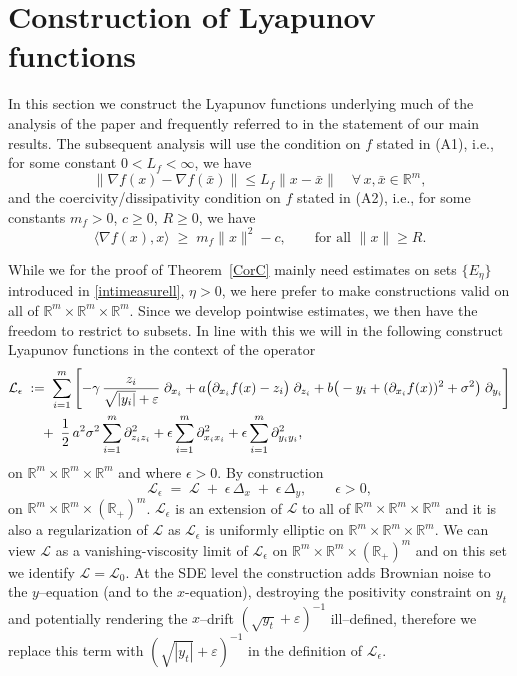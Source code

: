 \documentclass[11pt, a4paper,leqno]{amsart}
\theoremstyle{definition}
\numberwithin{equation}{section}
\newcommand{\R}{\mathbb R}
\begin{document}
\section{Construction of Lyapunov functions} \label{sec:lya}

In this section we construct the Lyapunov functions underlying much of the analysis of the paper and frequently referred to in the statement of our main results. The subsequent analysis will use the condition on $f$ stated in \textnormal{(A1)}, i.e.,
for some constant $0<L_f<\infty$, we have
\begin{equation}\label{D-}
\|\nabla f(x)-\nabla f(\bar x)\| \le L_f \|x-\bar x\|
\quad \forall\, x,\bar x \in \R^m,
\end{equation}
and the coercivity/dissipativity condition on $f$ stated in \textnormal{(A2)}, i.e., for some constants $m_f>0$, $c\ge0$, $R\ge0$, we have
\begin{equation}\label{D}
\langle \nabla f(x),x\rangle \;\ge\; m_f\|x\|^2 - c,
\qquad \text{for all }\|x\|\ge R.
\end{equation}

While we for the proof of Theorem~\ref{CorC} mainly need estimates on sets $\{E_\eta\}$ introduced in \eqref{intimeasurell}, $\eta>0$, we here prefer to make constructions
valid on all of $\mathbb R^m\times \mathbb R^m\times\mathbb R^m$. Since we develop pointwise estimates, we then have the freedom
to restrict to subsets. In line with this we will in the following construct Lyapunov functions in the context of the operator
\begin{align}\label{Regloss1}
\mathcal{L}_\epsilon \;&:=\; \sum_{i=1}^m \Bigg[{-\gamma\,\frac{z_i}{\sqrt{|y_i|}+\varepsilon}}\;\partial_{x_i}
+a\big(\partial_{x_i}f(x)-z_i\big)\;\partial_{z_i}+b\big(-y_i+(\partial_{x_i}f(x))^2+\sigma^2\big)\;\partial_{y_i}
\Bigg]\notag\\
&\quad +\;\frac12\,a^2\sigma^2\sum_{i=1}^m \partial_{z_i z_i}^2+\epsilon\sum_{i=1}^m \partial_{x_i x_i}^2+\epsilon\sum_{i=1}^m \partial_{y_i y_i}^2,
\end{align}
on $\R^m\times\R^m\times\R^m$ and where $\epsilon>0$.  By construction
\[
\mathcal{L}_\epsilon \;=\; \mathcal{L} \;+\; \epsilon\,\Delta_x\;+\; \epsilon\,\Delta_y,\qquad \epsilon>0,
\]
on $\R^m\times\R^m\times(\R_+)^m$. $\mathcal{L}_\epsilon$ is an extension of $\mathcal{L}$ to all of $\R^m\times\R^m\times\R^m$  and it is also a regularization of $\mathcal{L}$ as $\mathcal{L}_\epsilon$ is uniformly elliptic  on $\R^m\times\R^m\times\R^m$. We can  view $\mathcal L$ as a vanishing-viscosity limit of $\mathcal{L}_\epsilon$ on $\R^m\times\R^m\times(\R_+)^m$ and on this set we identify $\mathcal{L}=\mathcal{L}_0$.  At the SDE level the construction adds Brownian noise to the $y$–equation (and to the $x$-equation), destroying the positivity constraint on $y_t$ and potentially rendering the $x$–drift $(\sqrt{y_t}+\varepsilon)^{-1}$ ill–defined, therefore we replace this term with $(\sqrt{|y_t|}+\varepsilon)^{-1}$ in the definition of $\mathcal{L}_\epsilon$.
\end{document}
